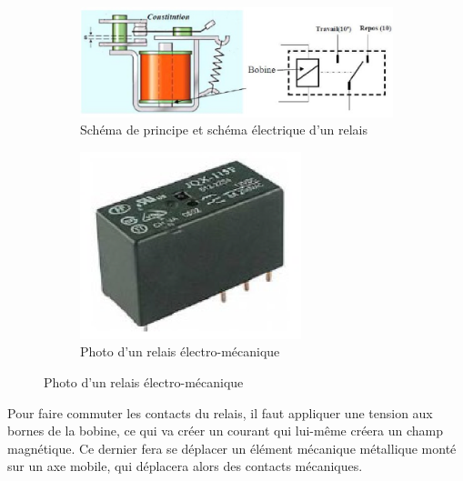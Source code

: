 \documentclass[10pt,fleqn]{article} %
\begin{document}
\begin{figure}[h]
  \begin{subfigure}[b]{.6\textwidth}
    \includegraphics[width=\textwidth]{images/relais_schema}
    \caption{Schéma de principe et schéma électrique d'un relais}
  \end{subfigure}
\hfill
  \begin{subfigure}[b]{.2\textwidth}
    \includegraphics[width=\textwidth]{images/relais_image}
    \caption{Photo d'un relais électro-mécanique}
  \end{subfigure}
  \label{fig:relais}
\end{figure}

Pour faire commuter les contacts du relais, il faut appliquer une tension aux bornes de la bobine, ce qui va créer un courant qui lui-même créera un champ magnétique. Ce dernier fera se déplacer un élément mécanique métallique monté sur un axe mobile, qui déplacera alors des contacts mécaniques.
\end{document}
